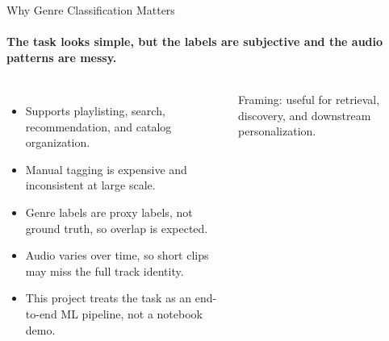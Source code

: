 \documentclass[aspectratio=169,10pt]{beamer}
\newcommand{\smallnote}[1]{{\footnotesize\color{DarkGray}#1}}
\begin{document}
\begin{frame}{Why Genre Classification Matters}
\framesubtitle{The task looks simple, but the labels are subjective and the audio patterns are messy.}
\begin{columns}[T,totalwidth=\textwidth]
\small
\setlength{\itemsep}{2pt}
\begin{itemize}
  \item Supports playlisting, search, recommendation, and catalog organization.
  \item Manual tagging is expensive and inconsistent at large scale.
  \item Genre labels are proxy labels, not ground truth, so overlap is expected.
  \item Audio varies over time, so short clips may miss the full track identity.
  \item This project treats the task as an end-to-end ML pipeline, not a notebook demo.
\end{itemize}

\centering
{}
\vspace{0.3cm}

\smallnote{Framing: useful for retrieval, discovery, and downstream personalization.}
\end{columns}
\end{frame}
\end{document}
